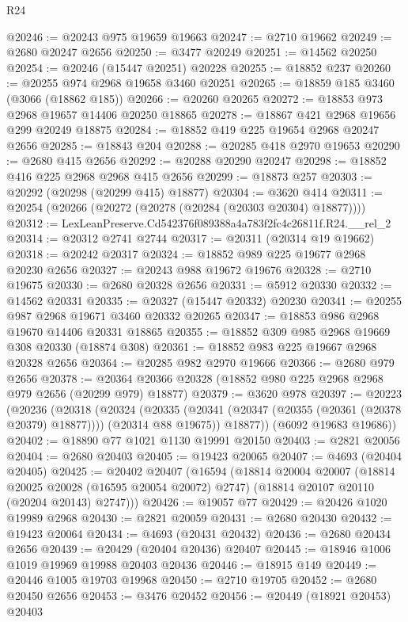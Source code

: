 \begin{lexlean}{R24}
\begin{coremodule}
@20246 := @20243 @975 @19659 @19663
@20247 := @2710 @19662
@20249 := @2680 @20247 @2656
@20250 := @3477 @20249
@20251 := @14562 @20250
@20254 := @20246 (@15447 @20251) @20228
@20255 := @18852 @237
@20260 := @20255 @974 @2968 @19658 @3460 @20251
@20265 := @18859 @185 @3460 (@3066 (@18862 @185))
@20266 := @20260 @20265
@20272 := @18853 @973 @2968 @19657 @14406 @20250 @18865
@20278 := @18867 @421 @2968 @19656 @299 @20249 @18875
@20284 := @18852 @419 @225 @19654 @2968 @20247 @2656
@20285 := @18843 @204
@20288 := @20285 @418 @2970 @19653
@20290 := @2680 @415 @2656
@20292 := @20288 @20290 @20247
@20298 := @18852 @416 @225 @2968 @2968 @415 @2656
@20299 := @18873 @257
@20303 := @20292 (@20298 (@20299 @415) @18877)
@20304 := @3620 @414
@20311 := @20254 (@20266 (@20272 (@20278 (@20284 (@20303 @20304) @18877))))
@20312 := LexLeanPreserve.Cd542376f089388a4a783f2fc4c26811f.R24.__rel_2
@20314 := @20312 @2741 @2744
@20317 := @20311 (@20314 @19 @19662)
@20318 := @20242 @20317
@20324 := @18852 @989 @225 @19677 @2968 @20230 @2656
@20327 := @20243 @988 @19672 @19676
@20328 := @2710 @19675
@20330 := @2680 @20328 @2656
@20331 := @5912 @20330
@20332 := @14562 @20331
@20335 := @20327 (@15447 @20332) @20230
@20341 := @20255 @987 @2968 @19671 @3460 @20332 @20265
@20347 := @18853 @986 @2968 @19670 @14406 @20331 @18865
@20355 := @18852 @309 @985 @2968 @19669 @308 @20330 (@18874 @308)
@20361 := @18852 @983 @225 @19667 @2968 @20328 @2656
@20364 := @20285 @982 @2970 @19666
@20366 := @2680 @979 @2656
@20378 := @20364 @20366 @20328 (@18852 @980 @225 @2968 @2968 @979 @2656 (@20299 @979) @18877)
@20379 := @3620 @978
@20397 := @20223
    (@20236
      (@20318
        (@20324
          (@20335 (@20341 (@20347 (@20355 (@20361 (@20378 @20379) @18877)))) (@20314 @88 @19675))
          @18877))
      (@6092 @19683 @19686))
@20402 := @18890 @77 @1021 @1130 @19991 @20150
@20403 := @2821 @20056
@20404 := @2680 @20403
@20405 := @19423 @20065
@20407 := @4693 (@20404 @20405)
@20425 := @20402
    @20407
    (@16594
      (@18814
        @20004
        @20007
        (@18814 @20025 @20028 (@16595 @20054 @20072) @2747)
        (@18814 @20107 @20110 (@20204 @20143) @2747)))
@20426 := @19057 @77
@20429 := @20426 @1020 @19989 @2968
@20430 := @2821 @20059
@20431 := @2680 @20430
@20432 := @19423 @20064
@20434 := @4693 (@20431 @20432)
@20436 := @2680 @20434 @2656
@20439 := @20429 (@20404 @20436) @20407
@20445 := @18946 @1006 @1019 @19969 @19988 @20403 @20436
@20446 := @18915 @149
@20449 := @20446 @1005 @19703 @19968
@20450 := @2710 @19705
@20452 := @2680 @20450 @2656
@20453 := @3476 @20452
@20456 := @20449 (@18921 @20453) @20403

\end{coremodule}
\end{lexlean}
